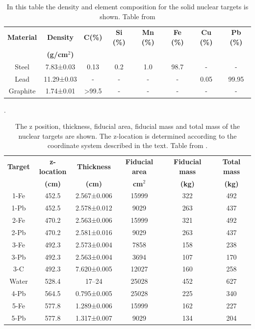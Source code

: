 \begin{itemize}
    \begin{table}[!htb]
        \centering
        \begin{tabular}{c c c c c c c c}
            \textbf{Material} & \textbf{Density} & \textbf{C(\%)} & \textbf{Si (\%)} & \textbf{Mn (\%)} & \textbf{Fe (\%)} & \textbf{Cu (\%)} & \textbf{Pb (\%)} \\ 
             & \textbf{(g/cm$^2$)} & & & & & & \\ \hline
            Steel & 7.83±0.03 & 0.13 & 0.2 & 1.0 & 98.7 & - & - \\
            Lead & 11.29±0.03 & - & - & - & - & 0.05 & 99.95\\
            Graphite & 1.74±0.01 & >99.5 & - & - & - & - & - \\ \hline
        \end{tabular}
        \caption{In this table the density and element composition for the solid nuclear targets is shown. Table from \cite{MINERvA}}.
        \label{tab:Chapter2:Detector:NuclearTargetsComposition}
    \end{table}

    \begin{table}[!htb]
        \centering
        \begin{tabular}{c c c c c c}
            \textbf{Target} & \textbf{z-location} & \textbf{Thickness} & \textbf{Fiducial area} & \textbf{Fiducial mass} & \textbf{Total mass}  \\ 
             & \textbf{(cm)} & \textbf{(cm)} & \textbf{cm$^2$} & \textbf{(kg)} & \textbf{(kg)} \\ \hline
            1-Fe & 452.5 & 2.567±0.006 & 15999 & 322 & 492 \\ 
            1-Pb & 452.5 & 2.578±0.012 & 9029 & 263 & 437 \\
            2-Fe & 470.2 & 2.563±0.006 & 15999 & 321 & 492 \\ 
            2-Pb & 470.2 & 	2.581±0.016 & 9029 & 263 & 437 \\
            3-Fe & 492.3 & 	2.573±0.004 & 7858 & 158 & 238 \\ 
            3-Pb & 492.3 & 2.563±0.004 & 3694 & 107 & 170 \\
            3-C & 492.3 & 7.620±0.005 & 12027 & 160 & 258 \\ 
            Water & 528.4 & 17–24 & 25028 & 452 & 627 \\
            4-Pb & 564.5 & 0.795±0.005 & 25028 & 225 & 340 \\
            5-Fe & 577.8 & 1.289±0.006 & 15999 & 162 & 227 \\ 
            5-Pb & 577.8 & 1.317±0.007 & 9029 & 134 & 204 \\ \hline
        \end{tabular}
        \caption{The z position, thickness, fiducial area, fiducial mass and total mass of the nuclear targets are shown. The z-location is determined according to the coordinate system described in the text. Table from \cite{MINERvA}. }
        \label{tab:Chapter2:Detector:Sizes}
    \end{table}


\end{itemize}

